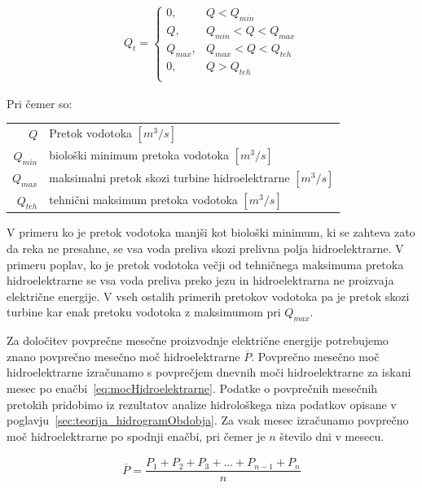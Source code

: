 \begin{ceqn}
	\begin{align}
	Q_t = \begin{cases}
	0, &Q < Q_{min}\\
	Q, &Q_{min} < Q < Q_{max}\\
	Q_{max}, &Q_{max}< Q < Q_{teh}\\
	0, &Q > Q_{teh}\\
	\end{cases}
	\end{align}
\end{ceqn}

Pri čemer so:
\begin{table}[htb!]
	\begin{tabular}{r|p{10cm}}
		$Q$ & Pretok vodotoka $\left[m^3/s \right]$\\
		$Q_{min}$ & biološki minimum pretoka vodotoka $\left[m^3/s \right]$ \\
		$Q_{max}$ & maksimalni pretok skozi turbine hidroelektrarne $\left[m^3/s \right]$ \\
		$Q_{teh}$ & tehnični maksimum pretoka vodotoka $\left[m^3/s \right]$ \\
	\end{tabular}
\end{table}

V primeru ko je pretok vodotoka manjši kot biološki minimum, ki se zahteva zato da reka ne presahne, se vsa voda preliva skozi prelivna polja hidroelektrarne. V primeru poplav, ko je pretok vodotoka večji od tehničnega maksimuma pretoka hidroelektrarne se vsa voda preliva preko jezu in hidroelektrarna ne proizvaja električne energije. V vseh ostalih primerih pretokov vodotoka pa je pretok skozi turbine kar enak pretoku vodotoka z maksimumom pri $Q_{max}$.



Za določitev povprečne mesečne proizvodnje električne energije potrebujemo znano povprečno mesečno moč hidroelektrarne  $\overline{P}$. Povprečno mesečno moč hidroelektrarne izračunamo s povprečjem dnevnih moči hidroelektrarne za iskani mesec po enačbi~\ref{eq:mocHidroelektrarne}. Podatke o povprečnih mesečnih pretokih pridobimo iz rezultatov analize hidrološkega niza podatkov opisane v poglavju~\ref{sec:teorija_hidrogramObdobja}. Za vsak mesec izračunamo povprečno moč hidroelektrarne po spodnji enačbi, pri čemer je $n$ število dni v mesecu. 



\begin{ceqn}
\begin{align}
\overline{P} = \dfrac{P_1 + P_2 + P_3 + ... + P_{n-1} + P_n}{n}
\end{align}
\end{ceqn}



